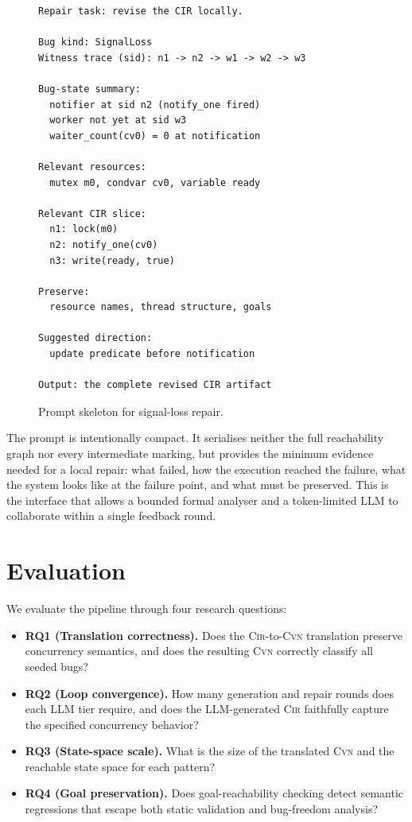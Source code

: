 \documentclass[sigconf]{acmart}
\begin{document}
\begin{figure}[t]
\begin{lstlisting}[basicstyle=\small\ttfamily,frame=single]
Repair task: revise the CIR locally.

Bug kind: SignalLoss
Witness trace (sid): n1 -> n2 -> w1 -> w2 -> w3

Bug-state summary:
  notifier at sid n2 (notify_one fired)
  worker not yet at sid w3
  waiter_count(cv0) = 0 at notification

Relevant resources:
  mutex m0, condvar cv0, variable ready

Relevant CIR slice:
  n1: lock(m0)
  n2: notify_one(cv0)
  n3: write(ready, true)

Preserve:
  resource names, thread structure, goals

Suggested direction:
  update predicate before notification

Output: the complete revised CIR artifact
\end{lstlisting}
\caption{Prompt skeleton for signal-loss repair.}
\label{fig:repair-prompt}
\end{figure}

The prompt is intentionally compact. It serialises neither the full reachability graph nor every intermediate marking, but provides the minimum evidence needed for a local repair: what failed, how the execution reached the failure, what the system looks like at the failure point, and what must be preserved. This is the interface that allows a bounded formal analyser and a token-limited LLM to collaborate within a single feedback round.

\section{Evaluation}
\label{sec:evaluation}

We evaluate the pipeline through four research questions:

\begin{itemize}[leftmargin=1.4em]
  \item \textbf{RQ1 (Translation correctness).}
    Does the \textsc{Cir}-to-\textsc{Cvn} translation preserve concurrency semantics, and does the resulting
    \textsc{Cvn} correctly classify all seeded bugs?
  \item \textbf{RQ2 (Loop convergence).}
    How many generation and repair rounds does each LLM tier require, and does the LLM-generated \textsc{Cir}
    faithfully capture the specified concurrency behavior?
  \item \textbf{RQ3 (State-space scale).}
    What is the size of the translated \textsc{Cvn} and the reachable state space for each pattern?
  \item \textbf{RQ4 (Goal preservation).}
    Does goal-reachability checking detect semantic regressions that escape both static validation and
    bug-freedom analysis?
\end{itemize}
\end{document}
